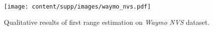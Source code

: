 \begin{figure}[t]
\centering
\texttt{[image: content/supp/images/waymo\_nvs.pdf]}

\caption{Qualitative results of first range estimation on \textit{Waymo NVS} dataset.}
\label{fig:supp_waymo_nvs}

\end{figure}